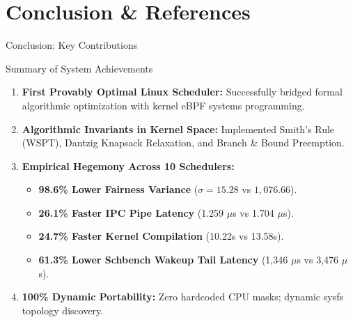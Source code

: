 \documentclass{beamer}
\begin{document}
\section{Conclusion \& References}

\begin{frame}{Conclusion: Key Contributions}
  \begin{block}{\small Summary of System Achievements}
    \footnotesize
    \begin{enumerate}\itemsep3pt\scriptsize
      \item \textbf{First Provably Optimal Linux Scheduler:} Successfully bridged formal algorithmic optimization with kernel eBPF systems programming.
      \item \textbf{Algorithmic Invariants in Kernel Space:} Implemented Smith's Rule (WSPT), Dantzig Knapsack Relaxation, and Branch \& Bound Preemption.
      \item \textbf{Empirical Hegemony Across 10 Schedulers:}
            \begin{itemize}\tiny
              \item \textbf{98.6\% Lower Fairness Variance} ($\sigma = 15.28$ vs $1,076.66$).
              \item \textbf{26.1\% Faster IPC Pipe Latency} (1.259 $\mu$s vs 1.704 $\mu$s).
              \item \textbf{24.7\% Faster Kernel Compilation} (10.22s vs 13.58s).
              \item \textbf{61.3\% Lower Schbench Wakeup Tail Latency} (1,346 $\mu$s vs 3,476 $\mu$s).
            \end{itemize}
      \item \textbf{100\% Dynamic Portability:} Zero hardcoded CPU masks; dynamic sysfs topology discovery.
    \end{enumerate}
  \end{block}
\end{frame}
\end{document}
